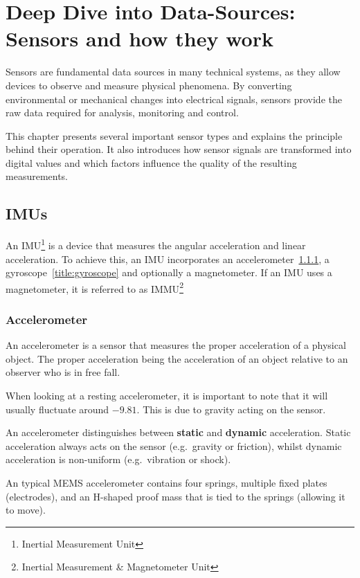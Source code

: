 \chapter{Deep Dive into Data-Sources: Sensors and how they work}\label{title:data-sources}
Sensors are fundamental data sources in many technical systems, as they allow devices to observe and measure physical phenomena. By converting environmental or mechanical changes into electrical signals, sensors provide the raw data required for analysis, monitoring and control.

This chapter presents several important sensor types and explains the principle behind their operation. It also introduces how sensor signals are transformed into digital values and which factors influence the quality of the resulting measurements.

\section{IMUs}\label{title:imu}

An IMU\footnote{Inertial Measurement Unit} is a device that measures the angular acceleration and linear acceleration. To achieve this, an IMU incorporates an accelerometer~\ref{title:accelerometer}, a gyroscope~\ref{title:gyroscope} and optionally a magnetometer. If an IMU uses a magnetometer, it is referred to as IMMU\footnote{Inertial Measurement \& Magnetometer Unit}

\subsection{Accelerometer}\label{title:accelerometer}
An accelerometer is a sensor that measures the proper acceleration of a physical object. The proper acceleration being the acceleration of an object relative to an observer who is in free fall.

When looking at a resting accelerometer, it is important to note that it will usually fluctuate around $-9.81$. This is due to gravity acting on the sensor.

An accelerometer distinguishes between \textbf{static} and \textbf{dynamic} acceleration. Static acceleration always acts on the sensor (e.g.\ gravity or friction), whilst dynamic acceleration is non-uniform (e.g.\ vibration or shock).\\ 
\noindent\cite{LRWeb:29}


An typical MEMS accelerometer contains four springs, multiple fixed plates (electrodes), and an H-shaped proof mass that is tied to the springs (allowing it to move).

